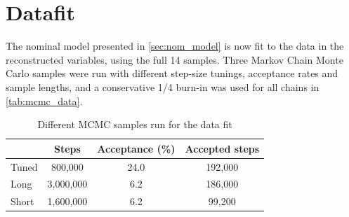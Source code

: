 \section{Datafit}
\label{sec:datafit}
The nominal model presented in \autoref{sec:nom_model} is now fit to the data in the reconstructed \pmu \cosmu variables, using the full 14 samples. Three Markov Chain Monte Carlo samples were run with different step-size tunings, acceptance rates and sample lengths, and a conservative 1/4 burn-in was used for all chains in \autoref{tab:mcmc_data}.
\begin{table}[h]
	\centering
	\begin{tabular}{l | c c c}
		\hline \hline
					& Steps		& Acceptance (\%) & Accepted steps \\
		\hline
		Tuned			& 800,000		& 24.0 	& 192,000 \\
		Long			& 3,000,000		& 6.2 	& 186,000 \\
		Short			& 1,600,000		& 6.2 	& 99,200 \\
		\hline \hline
	\end{tabular}
\caption{Different MCMC samples run for the data fit}
\label{tab:mcmc_data}
\end{table}

